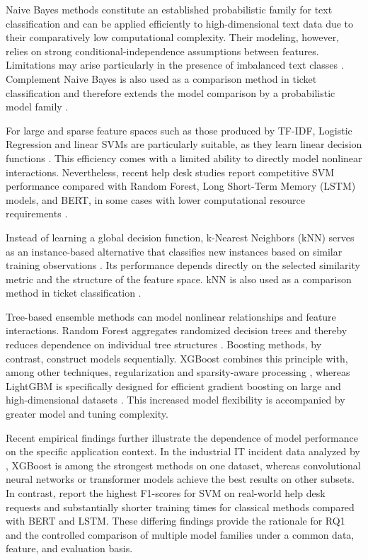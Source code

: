Naive Bayes methods constitute an established probabilistic family for text classification and can be applied efficiently to high-dimensional text data due to their comparatively low computational complexity. Their modeling, however, relies on strong conditional-independence assumptions between features. Limitations may arise particularly in the presence of imbalanced text classes \cite{kibriya2004multinomial,frank2006naive}. Complement Naive Bayes is also used as a comparison method in ticket classification and therefore extends the model comparison by a probabilistic model family \cite{zicari2022ticket}.

For large and sparse feature spaces such as those produced by TF-IDF, Logistic Regression and linear SVMs are particularly suitable, as they learn linear decision functions  \cite{joachims1998text,fan2008liblinear}. This efficiency comes with a limited ability to directly model nonlinear interactions. Nevertheless, recent help desk studies report competitive SVM performance compared with Random Forest, Long Short-Term Memory (LSTM) models, and BERT, in some cases with lower computational resource requirements \cite{martins2024port,bonechi2024support}.

Instead of learning a global decision function, k-Nearest Neighbors (kNN) serves as an instance-based alternative that classifies new instances based on similar training observations \cite{cover1967nearest}. Its performance depends directly on the selected similarity metric and the structure of the feature space. kNN is also used as a comparison method in ticket classification \cite{revina2020ticket}.

Tree-based ensemble methods can model nonlinear relationships and feature interactions. Random Forest aggregates randomized decision trees and thereby reduces dependence on individual tree structures \cite{breiman2001random}. Boosting methods, by contrast, construct models sequentially. XGBoost combines this principle with, among other techniques, regularization and sparsity-aware processing \cite{chen2016xgboost}, whereas LightGBM is specifically designed for efficient gradient boosting on large and high-dimensional datasets \cite{ke2017lightgbm}. This increased model flexibility is accompanied by greater model and tuning complexity.

Recent empirical findings further illustrate the dependence of model performance on the specific application context. In the industrial IT incident data analyzed by \citet{ahmed2023incident}, XGBoost is among the strongest methods on one dataset, whereas convolutional neural networks or transformer models achieve the best results on other subsets. In contrast, \citet{martins2024port} report the highest F1-scores for SVM on real-world help desk requests and substantially shorter training times for classical methods compared with BERT and LSTM. These differing findings provide the rationale for RQ1 and the controlled comparison of multiple model families under a common data, feature, and evaluation basis.

